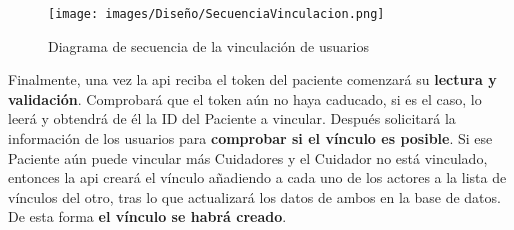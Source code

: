 \begin{figure}[H]
    \centering
    \texttt{[image: images/Diseño/SecuenciaVinculacion.png]}
    \caption{Diagrama de secuencia de la vinculación de usuarios}
    \label{dia:secuencia_vinculacion}
\end{figure}

Finalmente, una vez la \acrshort{api} reciba el \gls{token} del paciente comenzará su \textbf{lectura y validación}. Comprobará que el \gls{token} aún no haya caducado, si es el caso, lo leerá y obtendrá de él la ID del Paciente a vincular. Después solicitará la información de los usuarios para \textbf{comprobar si el vínculo es posible}. Si ese Paciente aún puede vincular más Cuidadores y el Cuidador no está vinculado, entonces la \acrshort{api} creará el vínculo añadiendo a cada uno de los actores a la lista de vínculos del otro, tras lo que actualizará los datos de ambos en la base de datos. De esta forma \textbf{el vínculo se habrá creado}.
